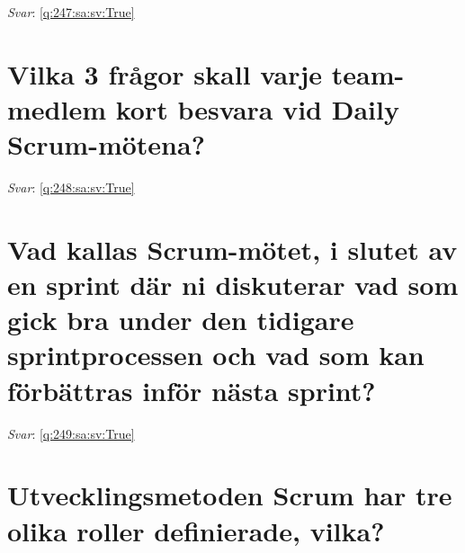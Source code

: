 \documentclass[a4paper,11pt,oneside]{book}
\begin{document}
\begin{sloppypar}
\label{q:247:sa:sv:False}

\vspace{2cm}

\noindent\makebox[\textwidth]{\hrulefill}

\vspace{1cm}

\textit{Svar}: \autoref{q:247:sa:sv:True}



\section{Vilka 3 fr\r{a}gor skall varje team-medlem kort besvara vid Daily Scrum-m\"otena?}

\label{q:248:sa:sv:False}

\vspace{2cm}

\noindent\makebox[\textwidth]{\hrulefill}

\vspace{1cm}

\textit{Svar}: \autoref{q:248:sa:sv:True}



\section{Vad kallas Scrum-m\"otet, i slutet av en sprint d\"ar ni diskuterar vad som gick bra under den tidigare sprintprocessen och vad som kan f\"orb\"attras inf\"or n\"asta sprint?}

\label{q:249:sa:sv:False}

\vspace{2cm}

\noindent\makebox[\textwidth]{\hrulefill}

\vspace{1cm}

\textit{Svar}: \autoref{q:249:sa:sv:True}



\section{Utvecklingsmetoden Scrum har tre olika roller definierade, vilka?}

\label{q:250:sa:sv:False}

\vspace{2cm}

\noindent\makebox[\textwidth]{\hrulefill}

\vspace{1cm}


\end{sloppypar}
\end{document}
